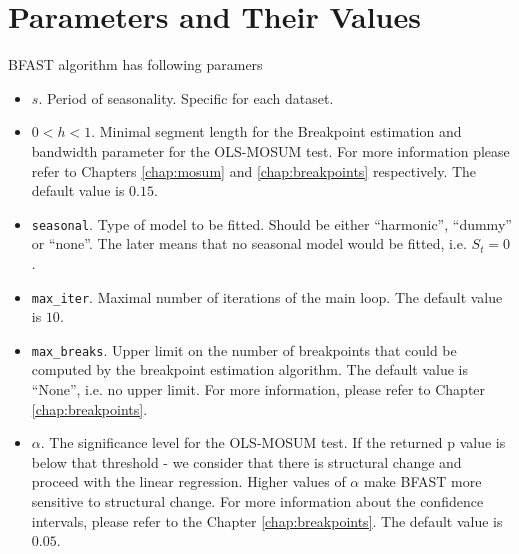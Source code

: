 \documentclass[main.tex]{subfiles}
\begin{document}
\section{Parameters and Their Values}
\label{sec:bfast_params}
BFAST algorithm has following paramers
\begin{itemize}
\item $s$. Period of seasonality. Specific for each dataset.
\item $0<h<1$. Minimal segment length for the Breakpoint estimation and
  bandwidth parameter for the OLS-MOSUM test. For more information please refer
  to Chapters \ref{chap:mosum} and \ref{chap:breakpoints} respectively.
  The default value is $0.15$.
\item \texttt{seasonal}. Type of model to be fitted. Should be either
  ``harmonic'', ``dummy'' or ``none''. The later means that no seasonal model
  would be fitted, i.e. $S_t=0$.
\item \texttt{max\_iter}. Maximal number of iterations of the main loop. The
  default value is $10$. 
\item \texttt{max\_breaks}. Upper limit on the number of breakpoints that could be computed by
  the breakpoint estimation algorithm. The default value is ``None'', i.e. no upper limit.
  For more information, please refer to Chapter \ref{chap:breakpoints}.
\item $\alpha$. The significance level for the OLS-MOSUM test. If the returned
  p value is below that threshold - we consider that there is structural change
  and proceed with the linear regression. Higher values of $\alpha$ make BFAST
  more sensitive to structural change. For more information about the confidence
  intervals, please refer to the Chapter \ref{chap:breakpoints}. The default
  value is $0.05$.
\end{itemize}

\biblio
\end{document}
